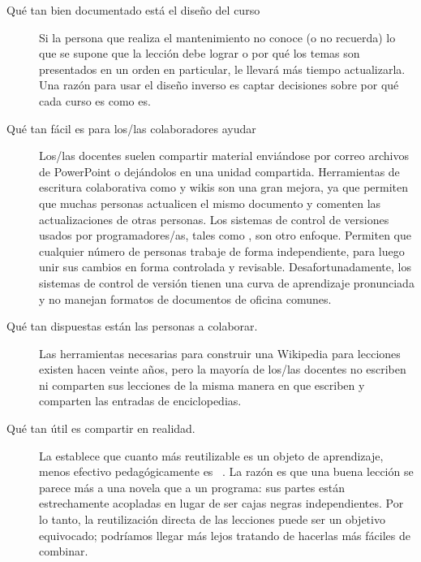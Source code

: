 \begin{description}
 
\item[Qué tan bien documentado está el diseño del curso]
  Si la persona que realiza el mantenimiento no conoce (o no recuerda)
  lo que se supone que la lección debe lograr
  o por qué los temas son presentados en un orden en particular,
  le llevará más tiempo actualizarla.
  Una razón para usar el diseño inverso
  es captar decisiones sobre por qué cada curso es como es.
 
\item[Qué tan fácil es para los/las colaboradores ayudar]
  Los/las docentes suelen compartir material enviándose por correo archivos de PowerPoint o dejándolos en una unidad compartida.
  Herramientas de escritura colaborativa como  y wikis
  son una gran mejora,
  ya que permiten que muchas personas actualicen el mismo documento
  y comenten las actualizaciones de otras personas.
  Los sistemas de control de versiones usados por programadores/as,
  tales como ,
  son otro enfoque.
  Permiten que cualquier número de personas trabaje de forma independiente,
  para luego unir sus cambios en forma controlada y revisable.
  Desafortunadamente,
  los sistemas de control de versión tienen una curva de aprendizaje pronunciada
   y no manejan formatos de documentos de oficina comunes.
 
\item[Qué tan dispuestas están las personas a colaborar.]
  Las herramientas necesarias para construir una Wikipedia para lecciones
  existen hacen veinte años,
  pero la mayoría de los/las docentes no escriben ni comparten sus lecciones
  de la misma manera en que escriben y comparten las entradas de enciclopedias.
 
\item[Qué tan útil es compartir en realidad.]
  La  establece que
  cuanto más reutilizable es un objeto de aprendizaje,
  menos efectivo pedagógicamente es ~\cite{Wile2002}.
  La razón es que una buena lección se parece más a una novela que a un programa:
  sus partes están estrechamente acopladas en lugar de ser cajas negras independientes.
  Por lo tanto, la reutilización directa de las lecciones puede ser un objetivo equivocado;
  podríamos llegar más lejos tratando de hacerlas más fáciles de combinar.
 \end{description}

